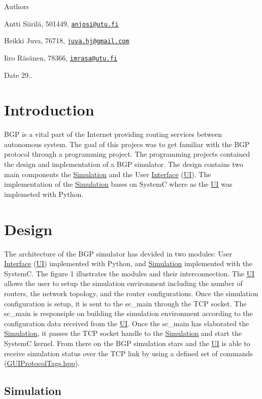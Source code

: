 \begin{DoxyAuthor}{Authors}
\begin{DoxyItemize}
\item Antti Siirilä, 501449, \href{mailto:anjosi@utu.fi}{\tt anjosi@utu.\-fi}\item Heikki Juva, 76718, \href{mailto:juva.hj@gmail.com}{\tt juva.\-hj@gmail.\-com}\item Iiro Räsänen, 78366, \href{mailto:imrasa@utu.fi}{\tt imrasa@utu.\-fi} \end{DoxyItemize}

\end{DoxyAuthor}
\begin{DoxyDate}{Date}
29.. 
\end{DoxyDate}
\hypertarget{index_s_intro}{}\section{Introduction}\label{index_s_intro}
B\-G\-P is a vital part of the Internet providing routing services between autonomous system. The goal of this projecs was to get familiar with the B\-G\-P protocol through a programming project. The programming projects contained the design and implementation of a B\-G\-P simulator. The design contains two main components the \hyperlink{classSimulation}{Simulation} and the User \hyperlink{classInterface}{Interface} (\hyperlink{namespaceUI}{U\-I}). The implementation of the \hyperlink{classSimulation}{Simulation} bases on System\-C where as the \hyperlink{namespaceUI}{U\-I} was implemeted with Python. \hypertarget{index_s_design}{}\section{Design}\label{index_s_design}
The architecture of the B\-G\-P simulator has devided in two modules\-: User \hyperlink{classInterface}{Interface} (\hyperlink{namespaceUI}{U\-I}) implemented with Python, and \hyperlink{classSimulation}{Simulation} implemented with the System\-C. The figure 1 illustrates the modules and their interconnection.  The \hyperlink{namespaceUI}{U\-I} allows the user to setup the simulation environment including the number of routers, the network topology, and the router configurations. Once the simulation configuration is setup, it is sent to the sc\-\_\-main through the T\-C\-P socket. The sc\-\_\-main is responsiple on building the simulation environment according to the configuration data received from the \hyperlink{namespaceUI}{U\-I}. Once the sc\-\_\-main has elaborated the \hyperlink{classSimulation}{Simulation}, it passes the T\-C\-P socket handle to the \hyperlink{classSimulation}{Simulation} and start the System\-C kernel. From there on the B\-G\-P simulation stars and the \hyperlink{namespaceUI}{U\-I} is able to receive simulation status over the T\-C\-P link by using a defined set of commands (\hyperlink{GUIProtocolTags_8hpp}{G\-U\-I\-Protocol\-Tags.\-hpp}). \hypertarget{index_sub_Simulation}{}\subsection{Simulation}\label{index_sub_Simulation}
